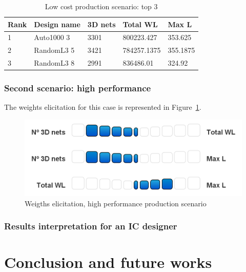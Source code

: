 \documentclass{svmult}
\begin{document}
\begin{table}[h!]
    \begin{center}
        \caption{Low cost production scenario: top 3}
        \label{tab:top3cost}
        \begin{tabular}{p{1.2cm}p{2.3cm}p{1.5cm}p{2cm}p{1.3cm}}
            \hline
            Rank & Design name & 3D nets & Total WL & Max L\\
            \hline
            1 & Auto1000 3 & 3301 & 800223.427 & 353.625 \\
            2 & RandomL3 5 & 3421 & 784257.1375 & 355.1875 \\
            3 & RandomL3 8 & 2991 & 836486.01 & 324.92 \\
            \hline
        \end{tabular}
    \end{center}
\end{table}

\subsubsection*{Second scenario: high performance}
The weights elicitation for this case is represented in Figure~\ref{fig:elicitperf}.

\begin{figure}[h!]
    \centering
    \includegraphics[width=0.62\linewidth]{elicitperf.png}
    \caption{Weigths elicitation, high performance production scenario}
    \label{fig:elicitperf}
\end{figure}

\subsubsection{Results interpretation for an IC designer}

\section{Conclusion and future works}




\end{document}
